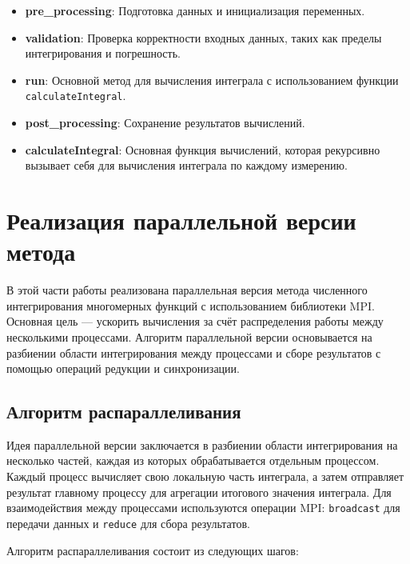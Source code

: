 \documentclass[12pt]{article}
\begin{document}
\begin{itemize}
\item \textbf{pre\_processing}: Подготовка данных и инициализация переменных.
\item \textbf{validation}: Проверка корректности входных данных, таких как пределы интегрирования и погрешность.
\item \textbf{run}: Основной метод для вычисления интеграла с использованием функции \texttt{calculateIntegral}.
\item \textbf{post\_processing}: Сохранение результатов вычислений.
\item \textbf{calculateIntegral}: Основная функция вычислений, которая рекурсивно вызывает себя для вычисления интеграла по каждому измерению.
\end{itemize}

\section*{Реализация параллельной версии метода}

В этой части работы реализована параллельная версия метода численного интегрирования многомерных функций с использованием библиотеки MPI. Основная цель — ускорить вычисления за счёт распределения работы между несколькими процессами. Алгоритм параллельной версии основывается на разбиении области интегрирования между процессами и сборе результатов с помощью операций редукции и синхронизации.

\subsection*{Алгоритм распараллеливания}

Идея параллельной версии заключается в разбиении области интегрирования на несколько частей, каждая из которых обрабатывается отдельным процессом. Каждый процесс вычисляет свою локальную часть интеграла, а затем отправляет результат главному процессу для агрегации итогового значения интеграла. Для взаимодействия между процессами используются операции MPI: \texttt{broadcast} для передачи данных и \texttt{reduce} для сбора результатов.

\noindent Алгоритм распараллеливания состоит из следующих шагов:
\end{document}
